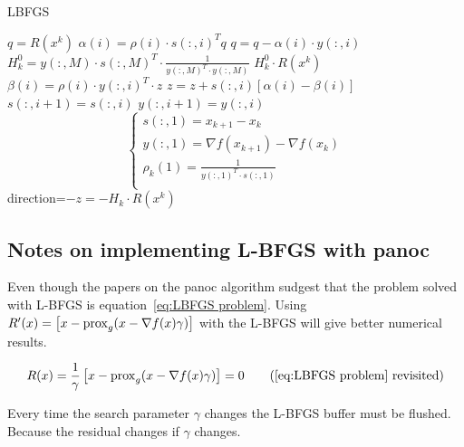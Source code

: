 		\begin{algorithm}
			\caption{LBFGS}
			\label{alg:LBFGS}
			\begin{algorithmic}[1]
				\State $q = R(x^k)$
				\State $\alpha(i)=\rho(i) \cdot s(:,i)^Tq$
				\State $q = q - \alpha(i) \cdot y(:,i)$
				\EndFor
				\State $H_k^0 = y(:,M) \cdot s(:,M)^T \cdot  \frac{1}{y(:,M)^T \cdot y(:,M)}$
				\State $H^0_k \cdot R(x^k)$
				\State $\beta(i) = \rho(i) \cdot y(:,i)^T \cdot z$
				\State $z = z + s(:,i)[\alpha(i)-\beta(i)]$
				\EndFor
				\State $s(:,i+1)=s(:,i)$
				\State $y(:,i+1)=y(:,i)$
				\EndFor
				\State $$\begin{cases}
				s(:,1) = x_{k+1} - x_k \\
				y(:,1) = \nabla f(x_{k+1}) - \nabla f(x_k)\\
				\rho_k(1) = \frac{1}{y(:,1)^T \cdot s(:,1)} \\ 
				\end{cases}
				$$
				\State \Return direction=$-z=-H_k \cdot R(x^k)$
				\EndProcedure
			\end{algorithmic}
		\end{algorithm}
	
	\subsection{Notes on implementing L-BFGS with panoc}
	Even though the papers on the panoc algorithm sudgest that the problem solved with L-BFGS is equation~\ref{eq:LBFGS problem}. Using $R'(x) = \left[ x - \operatorname{prox}_g( x - \nabla f(x)\gamma) \right]$ with the L-BFGS will give better numerical results.
	
	\begin{equation}
	R(x) = \frac{1}{\gamma}\left[ x - \prox_g( x - \nabla f(x)\gamma) \right] = 0
	\tag{\ref{eq:LBFGS problem} revisited}
	\end{equation}
	
	Every time the search parameter $\gamma$ changes the L-BFGS buffer must be flushed. Because the residual changes if $\gamma$ changes. 